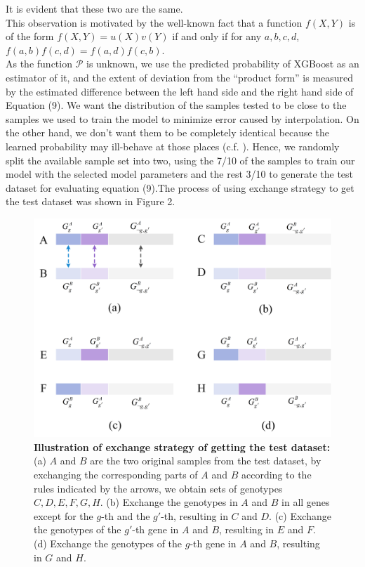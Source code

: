 \documentclass[11pt]{article}
\theoremstyle{plain}
\theoremstyle{definition}
\theoremstyle{remark}
\begin{document}
\noindent It is evident that these two are the same.\\

\noindent This observation is motivated by the well-known fact that a function $f(X,Y)$ is of the form $f(X,Y)=u(X)v(Y)$ if and only if for any $a,b,c,d$, $f(a,b)f(c,d)=f(a,d)f(c,b)$.\\

\noindent As the function $\mathcal{P}$ is unknown, we use the predicted probability of XGBoost as an estimator of it, and the extent of deviation from the ``product form'' is measured by the estimated difference between the left hand side and the right hand side of Equation (9). We want the distribution of the samples tested to be close to the samples we used to train the model to minimize error caused by interpolation. On the other hand, we don't want them to be completely identical because the learned probability may ill-behave at those places (c.f. \cite{13}). Hence, we randomly split the available sample set into two, using the 7/10 of the samples to train our model with the selected model parameters and the rest 3/10 to generate the test dataset for evaluating equation (9).The process of using exchange strategy to get the test dataset was shown in Figure 2.\\

\begin{figure}[H]
    \begin{center}
       \includegraphics[scale=0.6]{exchange.png}
    \end{center}
\caption{\label{det}{\bf Illustration of exchange strategy of getting the test dataset:} (a) $A$ and $B$ are the two original samples from the test dataset, by exchanging the corresponding parts of $A$ and $B$ according to the rules indicated by the arrows, we obtain sets of genotypes $C,D,E,F,G,H$. (b) Exchange the genotypes in $A$ and $B$ in all genes except for the $g$-th and the $g'$-th, resulting in $C$ and $D$. (c)  Exchange the genotypes of the $g'$-th gene in $A$ and $B$, resulting in $E$ and $F$. (d) Exchange the genotypes of the $g$-th gene in $A$ and $B$, resulting in $G$ and $H$.}
\end{figure}
\end{document}
